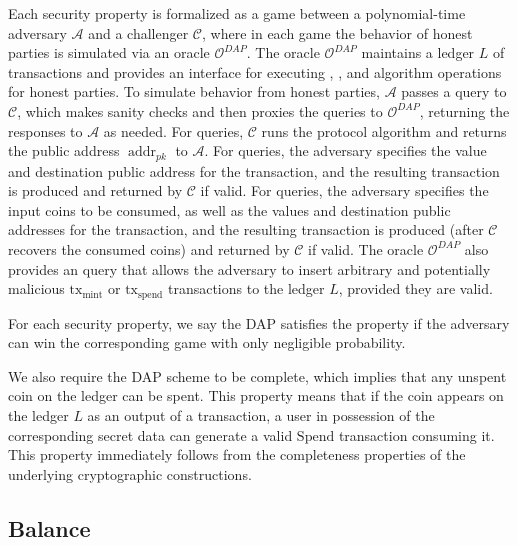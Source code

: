 \documentclass{llncs}
\newcommand{\addr}{\operatorname{addr}}
\begin{document}
Each security property is formalized as a game between a polynomial-time adversary $\mathcal{A}$ and a challenger $\mathcal{C}$, where in each game the behavior of honest parties is simulated via an oracle $\mathcal{O}^{DAP}$.
The oracle $\mathcal{O}^{DAP}$ maintains a ledger $L$ of transactions and provides an interface for executing , , and  algorithm operations for honest parties.
To simulate behavior from honest parties, $\mathcal{A}$ passes a query to $\mathcal{C}$, which makes sanity checks and then proxies the queries to $\mathcal{O}^{DAP}$, returning the responses to $\mathcal{A}$ as needed.
For  queries, $\mathcal{C}$ runs the  protocol algorithm and returns the public address $\addr_{pk}$ to $\mathcal{A}$.
For  queries, the adversary specifies the value and destination public address for the transaction, and the resulting transaction is produced and returned by $\mathcal{C}$ if valid.
For  queries, the adversary specifies the input coins to be consumed, as well as the values and destination public addresses for the transaction, and the resulting transaction is produced (after $\mathcal{C}$ recovers the consumed coins) and returned by $\mathcal{C}$ if valid.
The oracle $\mathcal{O}^{DAP}$ also provides an  query that allows the adversary to insert arbitrary and potentially malicious $\text{tx}_{\text{mint}}$ or $\text{tx}_{\text{spend}}$ transactions to the ledger $L$, provided they are valid.

For each security property, we say the DAP satisfies the property if the adversary can win the corresponding game with only negligible probability.

\begin{remark}
We also require the DAP scheme to be complete, which implies that any unspent coin on the ledger can be spent.
This property means that if the coin appears on the ledger $L$ as an output of a transaction, a user in possession of the corresponding secret data can generate a valid $\text{Spend}$ transaction consuming it.
This property immediately follows from the completeness properties of the underlying cryptographic constructions.
\end{remark}


\subsection{Balance}
\end{document}
